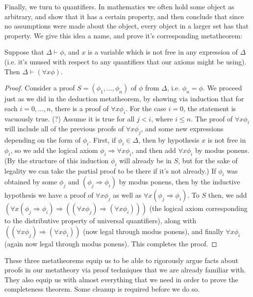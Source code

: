 Finally, we turn to quantifiers. In mathematics we often hold some object as arbitrary, and show that it has a certain property, and then conclude that since no assumptions were made about the object, every object in a larger set has that property. We give this idea a name, and prove it's corresponding metatheorem:
\begin{theorem}
    Suppose that $\Delta \vdash \phi$, and $x$ is a variable which is not free in any expression of $\Delta$ (i.e. it's unused with respect to any quantifiers that our axioms might be using). Then $\Delta \vdash (\forall x \phi)$. 
\end{theorem}
\begin{proof}
    Consider a proof $S = (\phi_1,...,\phi_n)$ of $\phi$ from $\Delta$, i.e. $\phi_n = \phi$. We proceed just as we did in the deduction metatheorem, by showing via induction that for each $i = 0,...,n$, there is a proof of $\forall x \phi_i$. For the case $i=0$, the statement is vacuously true. (?) Assume it is true for all $j<i$, where $i \leq n$. The proof of $\forall x \phi_i$ will include all of the previous proofs of $\forall x \phi_j$, and some new expressions depending on the form of $\phi_i$. First, if $\phi_i \in \Delta$, then by hypothesis $x$ is not free in $\phi_i$, so we add the logical axiom $\phi_i \Rightarrow \forall x \phi_i$, and then add $\forall x \phi_i$ by modus ponens. (By the structure of this induction $\phi_i$ will already be in $S$, but for the sake of legality we can take the partial proof to be there if it's not already.) If $\phi_i$ was obtained by some $\phi_j$ and $(\phi_j \Rightarrow \phi_i)$ by modus ponens, then by the inductive hypothesis we have a proof of $\forall x \phi_j$ as well as $\forall x (\phi_j \Rightarrow \phi_i)$. To $S$ then, we add $(\forall x (\phi_j \Rightarrow \phi_i) \Rightarrow ((\forall x \phi_j) \Rightarrow (\forall x \phi_i)))$ (the logical axiom corresponding to the distributive property of universal quantifiers),  along with $((\forall x \phi_j) \Rightarrow (\forall x \phi_i))$ (now legal through modus ponens), and finally $\forall x \phi_i$ (again now legal through modus ponens). This completes the proof.
\end{proof}
These three metatheorems equip us to be able to rigorously argue facts about proofs in our metatheory via proof techniques that we are already familiar with. They also equip us with almost everything that we need in order to prove the completeness theorem. Some cleanup is required before we do so.

